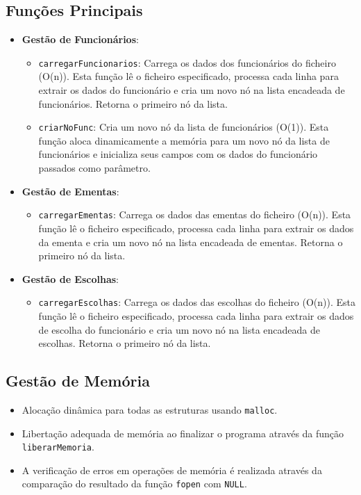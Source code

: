 \documentclass[a4paper,12pt]{report}
\begin{document}
\subsection{Funções Principais}
\begin{itemize}
    \item \textbf{Gestão de Funcionários}:
    \begin{itemize}
       \item \texttt{carregarFuncionarios}: Carrega os dados dos funcionários do ficheiro (O(n)). Esta função lê o ficheiro especificado, processa cada linha para extrair os dados do funcionário e cria um novo nó na lista encadeada de funcionários. Retorna o primeiro nó da lista.
        \item \texttt{criarNoFunc}: Cria um novo nó da lista de funcionários (O(1)). Esta função aloca dinamicamente a memória para um novo nó da lista de funcionários e inicializa seus campos com os dados do funcionário passados como parâmetro.
    \end{itemize}
    \item \textbf{Gestão de Ementas}:
    \begin{itemize}
        \item \texttt{carregarEmentas}: Carrega os dados das ementas do ficheiro (O(n)). Esta função lê o ficheiro especificado, processa cada linha para extrair os dados da ementa e cria um novo nó na lista encadeada de ementas. Retorna o primeiro nó da lista.
    \end{itemize}
    \item \textbf{Gestão de Escolhas}:
    \begin{itemize}
        \item \texttt{carregarEscolhas}: Carrega os dados das escolhas do ficheiro (O(n)). Esta função lê o ficheiro especificado, processa cada linha para extrair os dados de escolha do funcionário e cria um novo nó na lista encadeada de escolhas. Retorna o primeiro nó da lista.
      \end{itemize}
\end{itemize}

\subsection{Gestão de Memória}
\begin{itemize}
    \item Alocação dinâmica para todas as estruturas usando \texttt{malloc}.
    \item Libertação adequada de memória ao finalizar o programa através da função \texttt{liberarMemoria}.
    \item A verificação de erros em operações de memória é realizada através da comparação do resultado da função \texttt{fopen} com \texttt{NULL}.
\end{itemize}
\end{document}
